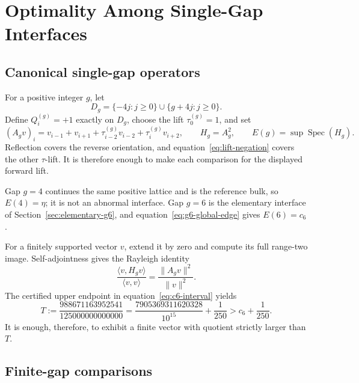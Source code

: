 \section{Optimality Among Single-Gap Interfaces}
\label{sec:single-gap}

\subsection{Canonical single-gap operators}
\label{subsec:canonical-single-gap-operators}

For a positive integer \(g\), let
\[
D_g=\{-4j:j\geq0\}\cup\{g+4j:j\geq0\}.
\]
Define \(Q_i^{(g)}=+1\) exactly on \(D_g\), choose the lift
\(\tau_0^{(g)}=1\), and set
\[
(A_gv)_i=v_{i-1}+v_{i+1}
+\tau_{i-2}^{(g)}v_{i-2}+\tau_i^{(g)}v_{i+2},
\qquad
H_g=A_g^2,\qquad
E(g)=\sup\operatorname{Spec}(H_g).
\]
Reflection covers the reverse orientation, and
equation~\eqref{eq:lift-negation} covers the other \(\tau\)-lift.  It is
therefore enough to make each comparison for the displayed forward lift.

Gap \(g=4\) continues the same positive lattice and is the reference bulk,
so \(E(4)=\eta\); it is not an abnormal interface.  Gap \(g=6\) is the
elementary interface of Section~\ref{sec:elementary-g6}, and
equation~\eqref{eq:g6-global-edge} gives \(E(6)=c_6\).

For a finitely supported vector \(v\), extend it by zero and compute its full
range-two image. Self-adjointness gives the Rayleigh identity
\begin{equation}\label{eq:single-gap-rayleigh}
\frac{\langle v,H_gv\rangle}{\langle v,v\rangle}
=\frac{\|A_gv\|^2}{\|v\|^2}.
\end{equation}
The certified upper endpoint in equation~\eqref{eq:c6-interval} yields
\[
T:=
\frac{988671163952541}{125000000000000}
=\frac{7905369311620328}{10^{15}}+\frac1{250}
>c_6+\frac1{250}.
\]
It is enough, therefore, to exhibit a finite vector with quotient strictly
larger than \(T\).

\subsection{Finite-gap comparisons}
\label{subsec:exact-finite-gap-comparisons}

